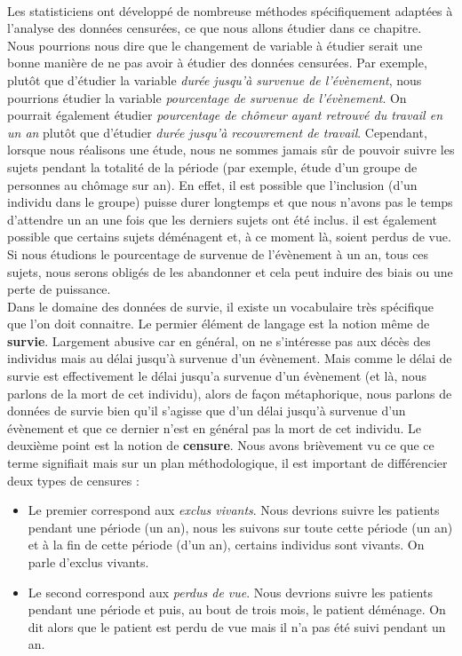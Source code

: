 \\
Les statisticiens ont développé de nombreuse méthodes spécifiquement adaptées à l'analyse des données censurées, ce que nous allons étudier dans ce chapitre.\newline 
\\
Nous pourrions nous dire que le changement de variable à étudier serait une bonne manière de ne pas avoir à étudier des données censurées. Par exemple, plutôt que d'étudier la variable \textit{durée jusqu'à survenue de l'évènement}, nous pourrions étudier la variable \textit{pourcentage de survenue de l'évènement}. On pourrait également étudier \textit{pourcentage de chômeur ayant retrouvé du travail en un an} plutôt que d'étudier \textit{durée jusqu'à recouvrement de travail}.\newline
Cependant, lorsque nous réalisons une étude, nous ne sommes jamais sûr de pouvoir suivre les sujets pendant la totalité de la période (par exemple, étude d'un groupe de personnes au chômage sur an). En effet, il est possible que l'inclusion (d'un individu dans le groupe) puisse durer longtemps et que nous n'avons pas le temps d'attendre un an une fois que les derniers sujets ont été inclus. il est également possible que certains sujets déménagent et, à ce moment là, soient perdus de vue.\newline
Si nous étudions le pourcentage de survenue de l'évènement à un an, tous ces sujets, nous serons obligés de les abandonner et cela peut induire des biais ou une perte de puissance.\newline
\\
Dans le domaine des données de survie, il existe un vocabulaire très spécifique que l'on doit connaitre.\newline
Le permier élément de langage est la notion même de \textbf{survie}. Largement abusive car en général, on ne s'intéresse pas aux décès des individus mais au délai jusqu'à survenue d'un évènement. Mais comme le délai de survie est effectivement le délai jusqu'a survenue d'un évènement (et là, nous parlons de la mort de cet individu), alors de façon métaphorique, nous parlons de données de survie bien qu'il s'agisse que d'un délai jusqu'à survenue d'un évènement et que ce dernier n'est en général pas la mort de cet individu.\newline
Le deuxième point est la notion de \textbf{censure}. Nous avons brièvement vu ce que ce terme signifiait mais sur un plan méthodologique, il est important de différencier deux types de censures : 
\begin{itemize}
\item Le premier correspond aux \textit{exclus vivants}. Nous devrions suivre les patients pendant une période (un an), nous les suivons sur toute cette période (un an) et à la fin de cette période (d'un an), certains individus sont vivants. On parle d'exclus vivants. 
\item Le second correspond aux \textit{perdus de vue}. Nous devrions suivre les patients pendant une période et puis, au bout de trois mois, le patient déménage. On dit alors que le patient est perdu de vue mais il n'a pas été suivi pendant un an. 
\end{itemize}

